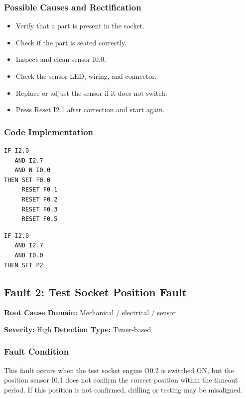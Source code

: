 \subsubsection{Possible Causes and Rectification}

\begin{itemize}
    \item Verify that a part is present in the socket.
    \item Check if the part is seated correctly.
    \item Inspect and clean sensor I0.0.
    \item Check the sensor LED, wiring, and connector.
    \item Replace or adjust the sensor if it does not switch.
    \item Press Reset I2.1 after correction and start again.
\end{itemize}

\subsubsection{Code Implementation}

\begin{verbatim}
IF I2.0
   AND I2.7
   AND N I0.0
THEN SET F0.0
     RESET F0.1
     RESET F0.2
     RESET F0.3
     RESET F0.5
\end{verbatim}

\begin{verbatim}
IF I2.0
   AND I2.7
   AND I0.0
THEN SET P2
\end{verbatim}

\subsection{Fault 2: Test Socket Position Fault}

\textbf{Root Cause Domain:} Mechanical / electrical / sensor

\textbf{Severity:} High \quad \textbf{Detection Type:} Timer-based

\subsubsection{Fault Condition}

This fault occurs when the test socket engine O0.2 is switched ON, but the position sensor I0.1 does not confirm the correct position within the timeout period. If this position is not confirmed, drilling or testing may be misaligned.

